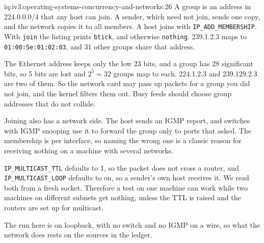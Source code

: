 \begin{solution}{iq:iv3:operating-systems-concurrency-and-networks:26}
A group is an address in 224.0.0.0/4 that any host can join. A sender, which need not join, sends one copy, and the network copies it to all members. A host joins with \texttt{IP\_ADD\_MEMBERSHIP}. With \texttt{join} the listing prints \texttt{b\textquotesingle{}tick\textquotesingle{}}, and otherwise \texttt{nothing}. 239.1.2.3 maps to \texttt{01:00:5e:01:02:03}, and 31 other groups share that address.
\label{lst:iv3:os:mcastmac}

The Ethernet address keeps only the low 23 bits, and a group has 28 significant bits, so 5 bits are lost and $2^5 = 32$ groups map to each. 224.1.2.3 and 239.129.2.3 are two of them. So the network card may pass up packets for a group you did not join, and the kernel filters them out. Busy feeds should choose group addresses that do not collide.

Joining also has a network side. The host sends an IGMP report, and switches with IGMP snooping use it to forward the group only to ports that asked. The membership is per interface, so naming the wrong one is a classic reason for receiving nothing on a machine with several networks.

\texttt{IP\_MULTICAST\_TTL} defaults to 1, so the packet does not cross a router, and \texttt{IP\_MULTICAST\_LOOP} defaults to on, so a sender's own host receives it. We read both from a fresh socket. Therefore a test on one machine can work while two machines on different subnets get nothing, unless the TTL is raised and the routers are set up for multicast.

The run here is on loopback, with no switch and no IGMP on a wire, so what the network does rests on the sources in the ledger.

\end{solution}

